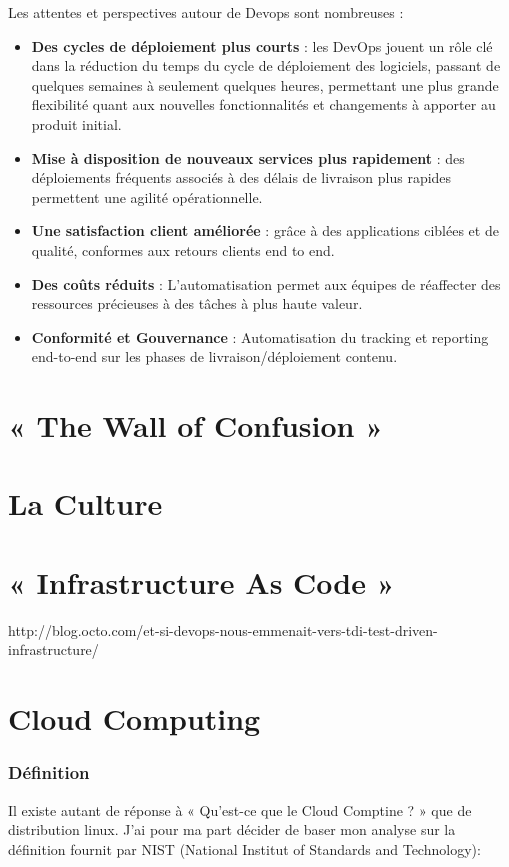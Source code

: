 Les attentes et perspectives autour de Devops sont nombreuses :\\

\begin{itemize}
  \item \textbf{Des cycles de déploiement plus courts} : les DevOps jouent un rôle clé dans la réduction du temps du cycle de déploiement des logiciels, passant de quelques semaines à seulement quelques heures, permettant une plus grande flexibilité quant aux nouvelles fonctionnalités et changements à apporter au produit initial.
  \item \textbf{Mise à disposition de nouveaux services plus rapidement} : des déploiements fréquents associés à des délais de livraison plus rapides permettent une agilité opérationnelle.
  \item \textbf{Une satisfaction client améliorée} : grâce à des applications ciblées et de qualité, conformes aux retours clients end to end.
  \item \textbf{Des coûts réduits} : L’automatisation permet aux équipes de réaffecter des ressources précieuses à des tâches à plus haute valeur.
  \item \textbf{Conformité et Gouvernance} : Automatisation du tracking et reporting end-to-end sur les phases de livraison/déploiement contenu.\\
\end{itemize}

\section{« The Wall of Confusion »}

\section{La Culture}

\section{« Infrastructure As Code »}

http://blog.octo.com/et-si-devops-nous-emmenait-vers-tdi-test-driven-infrastructure/

\section{Cloud Computing}

  \subsubsection{Définition}
  Il existe autant de réponse à « Qu’est-ce que le Cloud Comptine ? » que de distribution linux. J’ai pour ma part décider de baser mon analyse sur la définition fournit par NIST (National Institut of Standards and Technology):\\

